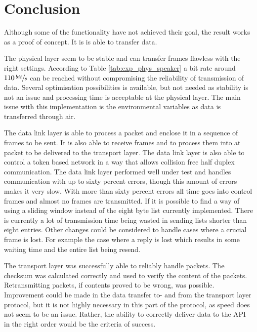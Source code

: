 \chapter{Conclusion}\label{chap:conclusion}
Although some of the functionality have not achieved their goal, the result works as a proof of concept. It is is able to transfer data.

The physical layer seem to be stable and can transfer frames flawless with the right settings. According to Table \ref{tab:exp_phys_speaker} a bit rate around $110\,\sfrac{bit}{s}$ can be reached without compromising the reliability of transmission of data. Several optimisation possibilities is available, but not needed as stability is not an issue and processing time is acceptable at the physical layer. The main issue with this implementation is the environmental variables as data is transferred through air.

The data link layer is able to process a packet and enclose it in a sequence of frames to be sent. It is also able to receive frames and to process them into at packet to be delivered to the transport layer. The data link layer is also able to control a token based network in a way that allows collision free half duplex communication. The data link layer performed well under test and handles communication with up to sixty percent errors, though this amount of errors makes it very slow. With more than sixty percent errors all time goes into control frames and almost no frames are transmitted.
If it is possible to find a way of using a sliding window instead of the eight byte list currently implemented. There is currently a lot of transmission time being wasted in sending lists shorter than eight entries. Other changes could be considered to handle cases where a crucial frame is lost. For example the case where a reply is lost which results in some waiting time and the entire list being resend.

The transport layer was successfully able to reliably handle packets. The checksum was calculated correctly and used to verify the content of the packets. Retransmitting packets, if contents proved to be wrong, was possible. Improvement could be made in the data transfer to- and from the transport layer protocol, but it is not highly necessary in this part of the protocol, as speed does not seem to be an issue. Rather, the ability to correctly deliver data to the API in the right order would be the criteria of success.

